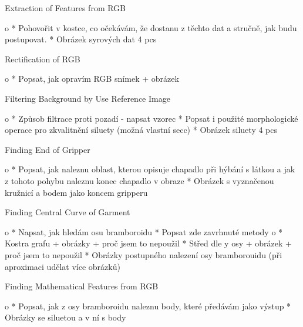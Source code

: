 \sec Extraction of Features from RGB

		\Green
		\begitems \style o
			* Pohovořit v kostce, co očekávám, že dostanu z těchto dat a stručně, jak budu postupovat.
			* Obrázek syrových dat 4 pcs
		\enditems
		\Black

\secc Rectification of RGB

		\Green
		\begitems \style o
			* Popsat, jak opravím RGB snímek + obrázek
		\enditems
		\Black

\secc Filtering Background by Use Reference Image

		\Green
		\begitems \style o
			* Způsob filtrace proti pozadí - napsat vzorec
			* Popsat i použité morphologické operace pro zkvalitnění siluety (možná vlastní secc)
			* Obrázek siluety 4 pcs
		\enditems
		\Black

\secc Finding End of Gripper

		\Green
		\begitems \style o
			* Popsat, jak naleznu oblast, kterou opisuje chapadlo při hýbání s látkou a jak z tohoto pohybu naleznu konec chapadlo v obraze
			* Obrázek s vyznačenou kružnicí a bodem jako koncem gripperu
		\enditems
		\Black

\secc Finding Central Curve of Garment

		\Green
		\begitems \style o
			* Napsat, jak hledám osu bramboroidu
			* Popsat zde zavrhnuté metody
			\begitems \style o
				* Kostra grafu + obrázky + proč jsem to nepoužil
				* Střed dle y osy + obrázek + proč jsem to nepoužil
			\enditems
			* Obrázky postupného nalezení osy bramborouidu (při aproximaci udělat více obrázků)
		\enditems
		\Black

\secc Finding Mathematical Features from RGB

		\Green
		\begitems \style o
			* Popsat, jak z osy bramboroidu naleznu body, které předávám jako výstup
			* Obrázky se siluetou a v ní s body
		\enditems
		\Black

